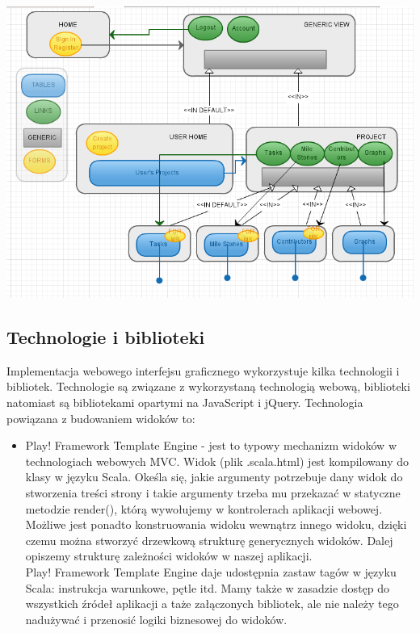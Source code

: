 \documentclass[a4paper,12pt,notitlepage]{mwrep}
\begin{document}
\begin{center}	
\vspace{4ex}	
	\includegraphics[scale=0.6]{images/ui_chart.png} \\
\vspace{4ex}
\end{center}

\subsection{Technologie i biblioteki}
Implementacja webowego interfejsu graficznego wykorzystuje kilka technologii i bibliotek. Technologie są związane z 
wykorzystaną technologią webową, biblioteki natomiast są bibliotekami opartymi na JavaScript i jQuery. Technologia 
powiązana z budowaniem widoków to:
\begin{itemize}
	\item	Play! Framework Template Engine - jest to typowy mechanizm widoków w technologiach webowych MVC. 
		Widok (plik .scala.html) jest kompilowany do klasy w języku Scala. Okeśla się, jakie argumenty potrzebuje 
		dany widok do stworzenia treści strony i takie argumenty trzeba mu przekazać w statyczne metodzie render(), 
		którą wywołujemy w kontrolerach aplikacji webowej. Możliwe jest ponadto konstruowania widoku wewnątrz innego 
		widoku, dzięki czemu można stworzyć drzewkową strukturę generycznych widoków. Dalej opiszemy strukturę zależności 
		widoków w naszej aplikacji. \\
		Play! Framework Template Engine daje udostępnia zastaw tagów w języku Scala: instrukcja warunkowe, pętle itd. Mamy 
		także w zasadzie dostęp do wszystkich źródeł aplikacji a taże załączonych bibliotek, ale nie należy tego nadużywać 
		i przenosić logiki biznesowej do widoków.
\end{itemize}
\end{document}
